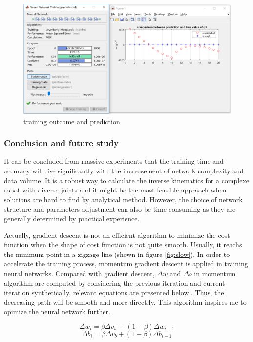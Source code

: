 \begin{figure}[htbp] 
\begin{center}
\includegraphics[width=\textwidth]{images/neural_network_outcome}
\caption{training outcome and prediction }
\label{fig:neural_network_outcome}
\end{center}
\end{figure}


\subsubsection{Conclusion and future study}
It can be concluded from massive experiments that the training time and accuracy will rise significantly with the increasement of network complexity and data volume. It is a robust way to calculate the inverse kinematics for a complexe robot with diverse joints and it might be the most feasible appraoch when solutions are hard to find by analytical method. However, the choice of network structure and parameters adjustment can also be time-consuming as they are generally determined by practical experience.

Actually, gradient descent is not an efficient algorithm to minimize the cost function when the shape of cost function is not quite smooth. Usually, it reachs the minimum point in a zigzage line (shown in figure  \ref{fig:slow}). In order to accelerate the training process, momentum gradient descent is applied in training neural networks. Compared with gradient descent, $\Delta w$ and $\Delta b$ in momentum algorithm are computed by considering the previous iteration and current iteration synthetically, relevant equations are presented below \citep{qian1999momentum}. Thus, the decreasing path will be smooth and more directily. This algorithm inspires me to opimize the neural network further.   

\begin{equation}
\Delta w_i = \beta \Delta v_w + (1-\beta)\Delta w_{i-1}
\end{equation}
\begin{equation}
\Delta b_i = \beta \Delta v_b + (1-\beta)\Delta b_{i-1}
\end{equation}

